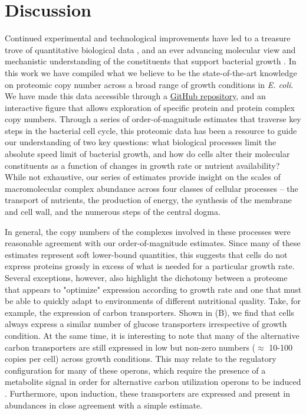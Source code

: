 \section{Discussion}
Continued experimental and technological improvements have led to a treasure
trove of quantitative biological data \citep{hui2015, schmidt2016, si2017,
gallagher2020, peebo2015, valgepea2013}, and an ever advancing molecular view
and mechanistic understanding of the constituents that support bacterial
growth \citep{taheriaraghi2015, morgenstein2015, si2019, karr2012,
kostinski2020}. In this work we have compiled what we believe to be the
state-of-the-art knowledge on proteomic copy number across a broad range of
growth conditions in \textit{E. coli}. We have made this data accessible
through a \href{https://github.com/RPGroup-PBoC/growth_limits}{GitHub
repository}, and an interactive figure that allows exploration of specific
protein and protein complex copy numbers. Through a series of
order-of-magnitude estimates that traverse key steps in the bacterial cell
cycle, this proteomic data has been a resource to guide our understanding of
two key questions: what biological processes limit the absolute speed limit
of bacterial growth, and how do cells alter their molecular constituents as a
function of changes in growth rate or nutrient availability? While not
exhaustive, our series of estimates provide insight on the scales of
macromolecular complex abundance across four classes of cellular processes --
the transport of nutrients, the production of energy, the synthesis of the
membrane and cell wall, and the numerous steps of the central dogma.

In general, the copy numbers of the complexes involved in these processes were
reasonable agreement with our order-of-magnitude estimates. Since many of these
estimates represent soft lower-bound quantities, this suggests that cells do not
express proteins grossly in excess of what is needed for a particular growth
rate. Several exceptions, however, also highlight the dichotomy between a
proteome that appears to "optimize" expression according to growth rate and one
that must be able to quickly adapt to environments of different nutritional
quality. Take, for example, the expression of carbon transporters. Shown in
(B), we find that cells always express a similar number of
glucose transporters irrespective of growth condition. At the same time, it is
interesting to note that many of the alternative carbon transporters are still
expressed in low but non-zero numbers ($\approx$ 10-100 copies per cell) across
growth conditions. This may relate to the regulatory configuration for many of
these operons, which require the presence of a metabolite signal in order for
alternative carbon utilization operons to be induced \citep{monod1949,
laxhuber2020}. Furthermore, upon induction, these transporters are expressed and
present in abundances in close agreement with a simple estimate.

